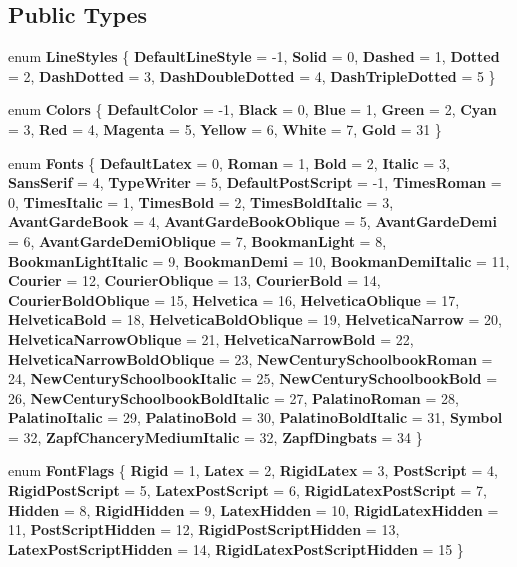 \subsection*{Public Types}
\begin{CompactItemize}
\item 
enum {\bf Line\-Styles} \{ {\bf Default\-Line\-Style} =  -1, 
{\bf Solid} =  0, 
{\bf Dashed} =  1, 
{\bf Dotted} =  2, 
{\bf Dash\-Dotted} =  3, 
{\bf Dash\-Double\-Dotted} =  4, 
{\bf Dash\-Triple\-Dotted} =  5
 \}
\item 
enum {\bf Colors} \{ {\bf Default\-Color} =  -1, 
{\bf Black} =  0, 
{\bf Blue} =  1, 
{\bf Green} =  2, 
{\bf Cyan} =  3, 
{\bf Red} =  4, 
{\bf Magenta} =  5, 
{\bf Yellow} =  6, 
{\bf White} =  7, 
{\bf Gold} =  31
 \}
\item 
enum {\bf Fonts} \{ {\bf Default\-Latex} =  0, 
{\bf Roman} =  1, 
{\bf Bold} =  2, 
{\bf Italic} =  3, 
{\bf Sans\-Serif} =  4, 
{\bf Type\-Writer} =  5, 
{\bf Default\-Post\-Script} =  -1, 
{\bf Times\-Roman} =  0, 
{\bf Times\-Italic} =  1, 
{\bf Times\-Bold} =  2, 
{\bf Times\-Bold\-Italic} =  3, 
{\bf Avant\-Garde\-Book} =  4, 
{\bf Avant\-Garde\-Book\-Oblique} =  5, 
{\bf Avant\-Garde\-Demi} =  6, 
{\bf Avant\-Garde\-Demi\-Oblique} =  7, 
{\bf Bookman\-Light} =  8, 
{\bf Bookman\-Light\-Italic} =  9, 
{\bf Bookman\-Demi} =  10, 
{\bf Bookman\-Demi\-Italic} =  11, 
{\bf Courier} =  12, 
{\bf Courier\-Oblique} =  13, 
{\bf Courier\-Bold} =  14, 
{\bf Courier\-Bold\-Oblique} =  15, 
{\bf Helvetica} =  16, 
{\bf Helvetica\-Oblique} =  17, 
{\bf Helvetica\-Bold} =  18, 
{\bf Helvetica\-Bold\-Oblique} =  19, 
{\bf Helvetica\-Narrow} =  20, 
{\bf Helvetica\-Narrow\-Oblique} =  21, 
{\bf Helvetica\-Narrow\-Bold} =  22, 
{\bf Helvetica\-Narrow\-Bold\-Oblique} =  23, 
{\bf New\-Century\-Schoolbook\-Roman} =  24, 
{\bf New\-Century\-Schoolbook\-Italic} =  25, 
{\bf New\-Century\-Schoolbook\-Bold} =  26, 
{\bf New\-Century\-Schoolbook\-Bold\-Italic} =  27, 
{\bf Palatino\-Roman} =  28, 
{\bf Palatino\-Italic} =  29, 
{\bf Palatino\-Bold} =  30, 
{\bf Palatino\-Bold\-Italic} =  31, 
{\bf Symbol} =  32, 
{\bf Zapf\-Chancery\-Medium\-Italic} =  32, 
{\bf Zapf\-Dingbats} =  34
 \}
\item 
enum {\bf Font\-Flags} \{ {\bf Rigid} =  1, 
{\bf Latex} =  2, 
{\bf Rigid\-Latex} =  3, 
{\bf Post\-Script} =  4, 
{\bf Rigid\-Post\-Script} =  5, 
{\bf Latex\-Post\-Script} =  6, 
{\bf Rigid\-Latex\-Post\-Script} =  7, 
{\bf Hidden} =  8, 
{\bf Rigid\-Hidden} =  9, 
{\bf Latex\-Hidden} =  10, 
{\bf Rigid\-Latex\-Hidden} =  11, 
{\bf Post\-Script\-Hidden} =  12, 
{\bf Rigid\-Post\-Script\-Hidden} =  13, 
{\bf Latex\-Post\-Script\-Hidden} =  14, 
{\bf Rigid\-Latex\-Post\-Script\-Hidden} =  15
 \}
\end{CompactItemize}
